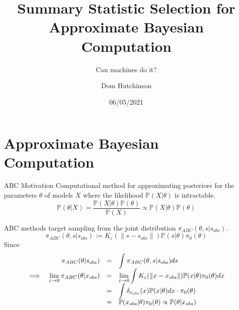 \documentclass[aspectratio=169]{beamer}
\title[Short Title]{Summary Statistic Selection for Approximate Bayesian Computation}
\subtitle{Can machines do it?}
\author{Dom Hutchinson}
\date{06/05/2021}
\begin{document}



\begin{frame}[leftcolor=CoolGrey,rightcolor=UniversityRed,div=0.85\paperwidth]
  \titlepage
\end{frame}

\section{Approximate Bayesian Computation}

\begin{frame}{ABC Motivation}\small
  Computational method for approximating posteriors for the parameters $\theta$ of models $X$ where the likelihood $\mathbb{P}(X|\theta)$ is intractable.
  \[ \mathbb{P}(\theta|X)=\frac{\mathbb{P}(X|\theta)\mathbb{P}(\theta)}{\mathbb{P}(X)}\propto\mathbb{P}(X|\theta)\mathbb{P}(\theta) \]

  ABC methods target sampling from the joint distribution $\pi_{ABC}(\theta,s|s_{obs})$.
  \[ \pi_{ABC}(\theta,s|s_{obs}):=K_\varepsilon(\|s-s_{obs}\|)\mathbb{P}(s|\theta)\pi_0(\theta) \]
  Since
  \[\everymath={\displaystyle}\begin{array}{rrrl}
    &\pi_{ABC}(\theta|s_{obs})&=&\int \pi_{ABC}(\theta,s|s_{obs})ds\\
    \implies&\lim_{\varepsilon\to0}\pi_{ABC}(\theta|x_{obs})&=&\lim_{\varepsilon\to0}\int K_\varepsilon(\|x-x_{obs}\|)\mathbb{P}(x|\theta)\pi_0(\theta)dx\\
    &&=&\int \delta_{x_{obs}}(x)\mathbb{P}(x|\theta)dx\cdot \pi_0(\theta)\\
    &&=&\mathbb{P}(x_{obs}|\theta)\pi_0(\theta)\propto\mathbb{P}(\theta|x_{obs})
  \end{array}\]
\end{frame}
\end{document}
